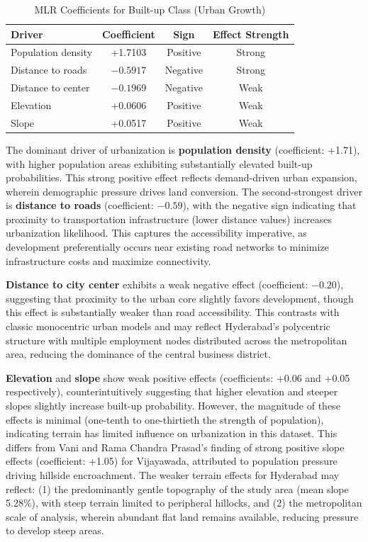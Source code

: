 \documentclass[12pt,a4paper]{article}
\begin{document}
\begin{table}[H]
\caption{MLR Coefficients for Built-up Class (Urban Growth)}
\label{tab:mlr_coefficients}
\centering
\small
\renewcommand{\arraystretch}{1.2}
\begin{tabular}{lccc}
\toprule
\textbf{Driver} & \textbf{Coefficient} & \textbf{Sign} & \textbf{Effect Strength} \\
\midrule
Population density & +1.7103 & Positive & Strong \\
Distance to roads & $-0.5917$ & Negative & Strong \\
Distance to center & $-0.1969$ & Negative & Weak \\
Elevation & +0.0606 & Positive & Weak \\
Slope & +0.0517 & Positive & Weak \\
\bottomrule
\end{tabular}
\end{table}

The dominant driver of urbanization is \textbf{population density} (coefficient: +1.71), with higher population areas exhibiting substantially elevated built-up probabilities. This strong positive effect reflects demand-driven urban expansion, wherein demographic pressure drives land conversion. The second-strongest driver is \textbf{distance to roads} (coefficient: $-0.59$), with the negative sign indicating that proximity to transportation infrastructure (lower distance values) increases urbanization likelihood. This captures the accessibility imperative, as development preferentially occurs near existing road networks to minimize infrastructure costs and maximize connectivity.

\textbf{Distance to city center} exhibits a weak negative effect (coefficient: $-0.20$), suggesting that proximity to the urban core slightly favors development, though this effect is substantially weaker than road accessibility. This contrasts with classic monocentric urban models and may reflect Hyderabad's polycentric structure with multiple employment nodes distributed across the metropolitan area, reducing the dominance of the central business district.

\textbf{Elevation} and \textbf{slope} show weak positive effects (coefficients: +0.06 and +0.05 respectively), counterintuitively suggesting that higher elevation and steeper slopes slightly increase built-up probability. However, the magnitude of these effects is minimal (one-tenth to one-thirtieth the strength of population), indicating terrain has limited influence on urbanization in this dataset. This differs from Vani and Rama Chandra Prasad's \cite{vani2022} finding of strong positive slope effects (coefficient: +1.05) for Vijayawada, attributed to population pressure driving hillside encroachment. The weaker terrain effects for Hyderabad may reflect: (1) the predominantly gentle topography of the study area (mean slope 5.28\%), with steep terrain limited to peripheral hillocks, and (2) the metropolitan scale of analysis, wherein abundant flat land remains available, reducing pressure to develop steep areas.
\end{document}
